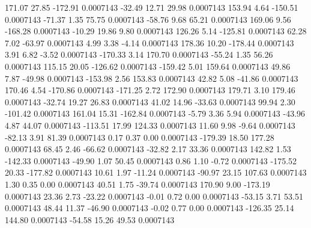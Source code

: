       171.07       27.85     -172.91     0.0007143
      -32.49       12.71       29.98     0.0007143
      153.94        4.64     -150.51     0.0007143
      -71.37        1.35       75.75     0.0007143
      -58.76        9.68       65.21     0.0007143
      169.06        9.56     -168.28     0.0007143
      -10.29       19.86        9.80     0.0007143
      126.26        5.14     -125.81     0.0007143
       62.28        7.02      -63.97     0.0007143
        4.99        3.38       -4.14     0.0007143
      178.36       10.20     -178.44     0.0007143
        3.91        6.82       -3.52     0.0007143
     -170.33        3.14      170.70     0.0007143
      -55.24        1.35       56.26     0.0007143
      115.15       20.05     -126.62     0.0007143
     -159.42        5.01      159.64     0.0007143
       49.86        7.87      -49.98     0.0007143
     -153.98        2.56      153.83     0.0007143
       42.82        5.08      -41.86     0.0007143
      170.46        4.54     -170.86     0.0007143
     -171.25        2.72      172.90     0.0007143
      179.71        3.10      179.46     0.0007143
      -32.74       19.27       26.83     0.0007143
       41.02       14.96      -33.63     0.0007143
       99.94        2.30     -101.42     0.0007143
      161.04       15.31     -162.84     0.0007143
       -5.79        3.36        5.94     0.0007143
      -43.96        4.87       44.07     0.0007143
     -113.51       17.99      124.33     0.0007143
       11.60        9.98       -9.64     0.0007143
      -82.13        3.91       81.39     0.0007143
        0.17        0.37        0.00     0.0007143
     -179.39       18.50      177.28     0.0007143
       68.45        2.46      -66.62     0.0007143
      -32.82        2.17       33.36     0.0007143
      142.82        1.53     -142.33     0.0007143
      -49.90        1.07       50.45     0.0007143
        0.86        1.10       -0.72     0.0007143
     -175.52       20.33     -177.82     0.0007143
       10.61        1.97      -11.24     0.0007143
      -90.97       23.15      107.63     0.0007143
        1.30        0.35        0.00     0.0007143
       40.51        1.75      -39.74     0.0007143
      170.90        9.00     -173.19     0.0007143
       23.36        2.73      -23.22     0.0007143
       -0.01        0.72        0.00     0.0007143
      -53.15        3.71       53.51     0.0007143
       48.44       11.37      -46.90     0.0007143
       -0.02        0.77        0.00     0.0007143
     -126.35       25.14      144.80     0.0007143
      -54.58       15.26       49.53     0.0007143
